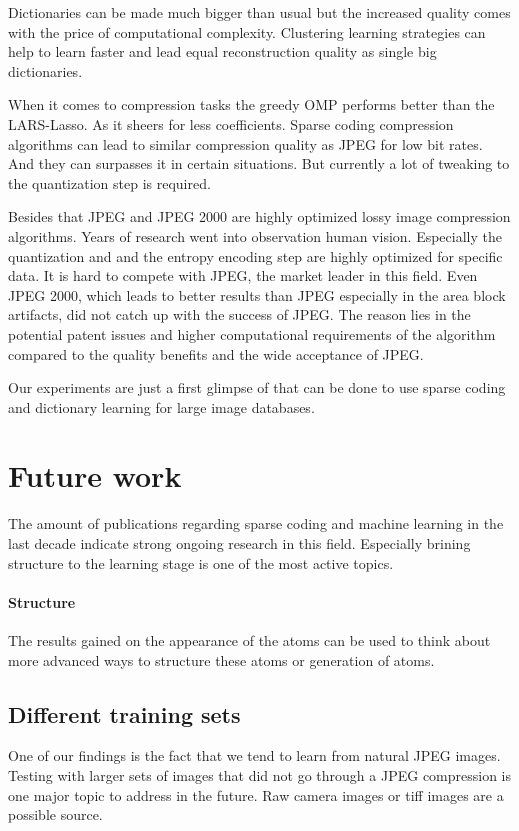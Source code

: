 Dictionaries can be made much bigger than usual but the increased quality
comes with the price of computational complexity. Clustering learning strategies
can help to learn faster and lead equal reconstruction quality as single big
dictionaries.

When it comes to compression tasks the greedy OMP performs better
than the LARS-Lasso. As it sheers for less coefficients. Sparse coding 
compression algorithms can lead to similar compression quality as JPEG 
for low bit rates. And they can surpasses it in certain situations. But
currently a lot of tweaking to the quantization step is required. 

Besides that JPEG and JPEG 2000 are highly optimized lossy image compression
algorithms. Years of research went into observation human vision. Especially the
quantization and and the entropy encoding step are highly optimized for specific
data. It is hard to compete with JPEG, the market leader in this field.  Even
JPEG 2000, which leads to better results than JPEG especially in the area block
artifacts, did not catch up with the success of JPEG. The reason lies in the
potential patent issues and higher computational requirements of the algorithm
compared to the quality benefits and the wide acceptance of JPEG.

Our experiments are just a first glimpse of that can be done to use sparse
coding and dictionary learning for large image databases.

\section{Future work}
The amount of publications regarding sparse coding and machine learning in the
last decade indicate strong ongoing research in this field. Especially
brining structure to the learning stage is one of the most active topics.

\paragraph{Structure}
The results gained on the appearance of the atoms can be used to think
about more advanced ways to structure these atoms or generation of atoms.

\subsection{Different training sets}
One of our findings is the fact that we tend to learn from natural JPEG images.
Testing with larger sets of images that did not go through a JPEG compression
is one major topic to address in the future. Raw camera images or tiff images
are a possible source. 

